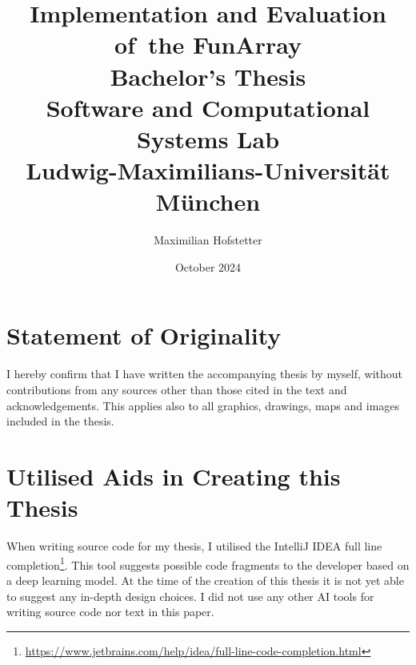 \documentclass{report}
\title{\Huge{}Implementation and Evaluation of~the FunArray\\[1em]\large{}Bachelor's Thesis\\[1em]Software and Computational Systems Lab\\Ludwig-Maximilians-Universit\"at M\"unchen}
\date{October 2024}
\author{Maximilian Hofstetter}
\begin{document}
\section*{Statement of Originality}
\thispagestyle{empty}
I hereby confirm that I have written the accompanying thesis by myself, without contributions from any sources other than those cited in the text and acknowledgements. This applies also to all graphics, drawings, maps and images included in the thesis.

\section*{Utilised Aids in Creating this Thesis}

When writing source code for my thesis, I utilised the IntelliJ IDEA full line completion\footnote{\url{https://www.jetbrains.com/help/idea/full-line-code-completion.html}}. This tool suggests possible code fragments to the developer based on a deep learning model. At the time of the creation of this thesis it is not yet able to suggest any in-depth design choices. I did not use any other AI tools for writing source code nor text in this paper.

\maketitle
\setcounter{tocdepth}{1}
\tableofcontents







\newpage


\end{document}

